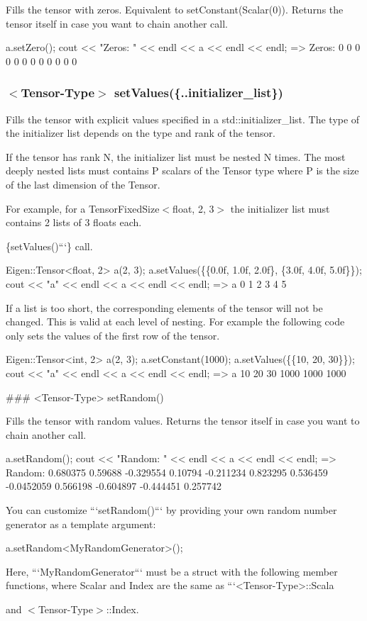 Fills the tensor with zeros. Equivalent to {\ttfamily set\+Constant(\+Scalar(0))}. Returns the tensor itself in case you want to chain another call. \begin{DoxyVerb}a.setZero();
cout << "Zeros: " << endl << a << endl << endl;
=>
Zeros:
0 0 0 0
0 0 0 0
0 0 0 0
\end{DoxyVerb}


\subsubsection*{$<$Tensor-\/\+Type$>$ set\+Values(\{..initializer\+\_\+list\})}

Fills the tensor with explicit values specified in a std\+::initializer\+\_\+list. The type of the initializer list depends on the type and rank of the tensor.

If the tensor has rank N, the initializer list must be nested N times. The most deeply nested lists must contains P scalars of the Tensor type where P is the size of the last dimension of the Tensor.

For example, for a {\ttfamily Tensor\+Fixed\+Size$<$float, 2, 3$>$} the initializer list must contains 2 lists of 3 floats each.


\begin{DoxyCode}
\{setValues()```\}
call.

    Eigen::Tensor<float, 2> a(2, 3);
    a.setValues(\{\{0.0f, 1.0f, 2.0f\}, \{3.0f, 4.0f, 5.0f\}\});
    cout << "a" << endl << a << endl << endl;
    =>
    a
    0 1 2
    3 4 5

If a list is too short, the corresponding elements of the tensor will not be
changed.  This is valid at each level of nesting.  For example the following
code only sets the values of the first row of the tensor.

    Eigen::Tensor<int, 2> a(2, 3);
    a.setConstant(1000);
    a.setValues(\{\{10, 20, 30\}\});
    cout << "a" << endl << a << endl << endl;
    =>
    a
    10   20   30
    1000 1000 1000

### <Tensor-Type> setRandom()

Fills the tensor with random values.  Returns the tensor itself in case you
want to chain another call.

    a.setRandom();
    cout << "Random: " << endl << a << endl << endl;
    =>
    Random:
      0.680375    0.59688  -0.329554    0.10794
     -0.211234   0.823295   0.536459 -0.0452059
      0.566198  -0.604897  -0.444451   0.257742

You can customize ```setRandom()``` by providing your own random number
generator as a template argument:

    a.setRandom<MyRandomGenerator>();

Here, ```MyRandomGenerator``` must be a struct with the following member
functions, where Scalar and Index are the same as ```<Tensor-Type>::Scala
\end{DoxyCode}
 and {\ttfamily $<$Tensor-\/\+Type$>$\+::\+Index}.

